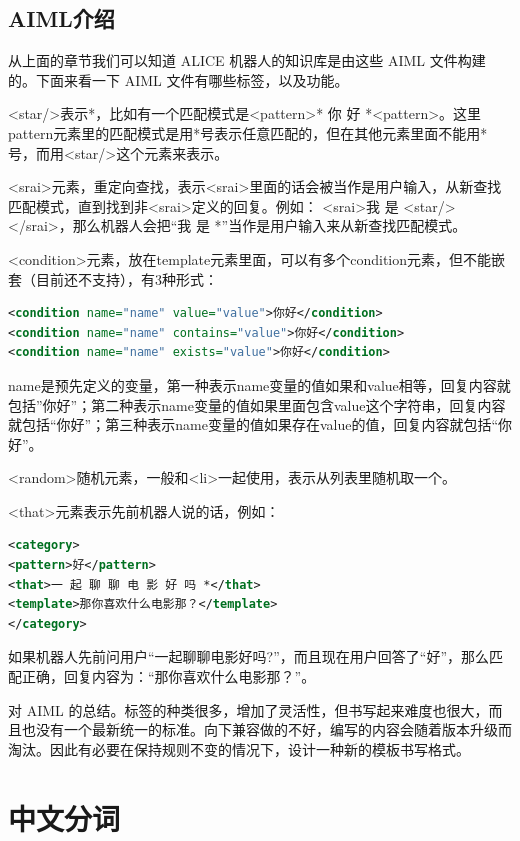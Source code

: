 \documentclass[bachelor,winfonts]{jnuthesis}
\begin{document}
\section{AIML介绍}
从上面的章节我们可以知道 ALICE 机器人的知识库是由这些 AIML 文件构建的。下面来看一下 AIML 文件有哪些标签，以及功能。

<star/>表示*，比如有一个匹配模式是<pattern>* 你 好 *<pattern>。这里pattern元素里的匹配模式是用*号表示任意匹配的，但在其他元素里面不能用*号，而用<star/>这个元素来表示。

<srai>元素，重定向查找，表示<srai>里面的话会被当作是用户输入，从新查找匹配模式，直到找到非<srai>定义的回复。例如：
<srai>我 是 <star/></srai>，那么机器人会把“我 是 *”当作是用户输入来从新查找匹配模式。

<condition>元素，放在template元素里面，可以有多个condition元素，但不能嵌套（目前还不支持），有3种形式：

\begin{lstlisting}[language=XML]
<condition name="name" value="value">你好</condition>
<condition name="name" contains="value">你好</condition>
<condition name="name" exists="value">你好</condition>
\end{lstlisting}

name是预先定义的变量，第一种表示name变量的值如果和value相等，回复内容就包括”你好”；第二种表示name变量的值如果里面包含value这个字符串，回复内容就包括“你好”；第三种表示name变量的值如果存在value的值，回复内容就包括“你好”。

<random>随机元素，一般和<li>一起使用，表示从列表里随机取一个。

<that>元素表示先前机器人说的话，例如：

\begin{lstlisting}[language=XML]
<category> 
<pattern>好</pattern> 
<that>一 起 聊 聊 电 影 好 吗 *</that> 
<template>那你喜欢什么电影那？</template> 
</category>
\end{lstlisting}

如果机器人先前问用户“一起聊聊电影好吗?”，而且现在用户回答了“好”，那么匹配正确，回复内容为：“那你喜欢什么电影那？”。

对 AIML 的总结。标签的种类很多，增加了灵活性，但书写起来难度也很大，而且也没有一个最新统一的标准。向下兼容做的不好，编写的内容会随着版本升级而淘汰。因此有必要在保持规则不变的情况下，设计一种新的模板书写格式。


\chapter{中文分词}
\end{document}
